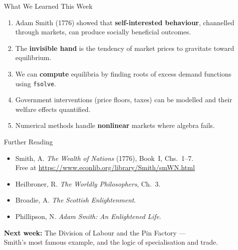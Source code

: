 \documentclass[aspectratio=169, 10pt]{beamer}
\begin{document}
\begin{frame}{What We Learned This Week}
\begin{enumerate}
  \item Adam Smith (1776) showed that \textbf{self-interested behaviour},
        channelled through markets, can produce socially beneficial outcomes.
  \item The \textbf{invisible hand} is the tendency of market prices
        to gravitate toward equilibrium.
  \item We can \textbf{compute} equilibria by finding roots of excess demand
        functions using \texttt{fsolve}.
  \item Government interventions (price floors, taxes) can be modelled
        and their welfare effects quantified.
  \item Numerical methods handle \textbf{nonlinear} markets where
        algebra fails.
\end{enumerate}
\end{frame}

\begin{frame}{Further Reading}
\begin{itemize}
  \item Smith, A. \textit{The Wealth of Nations} (1776), Book~I, Chs.~1--7.\\
        Free at \url{https://www.econlib.org/library/Smith/smWN.html}
  \item Heilbroner, R. \textit{The Worldly Philosophers}, Ch.~3.
  \item Broadie, A. \textit{The Scottish Enlightenment}.
  \item Phillipson, N. \textit{Adam Smith: An Enlightened Life}.
\end{itemize}
\vspace{1em}
\begin{center}
\textbf{Next week:} The Division of Labour and the Pin Factory ---\\
Smith's most famous example, and the logic of specialisation and trade.
\end{center}
\end{frame}
\end{document}
